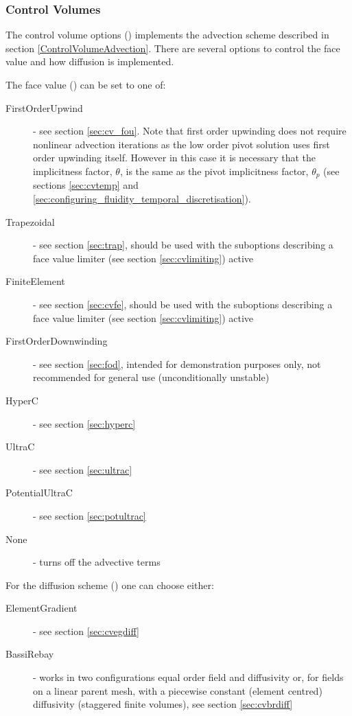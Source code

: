 \subsubsection{Control Volumes}\label{sec:CVs}

The control volume options () implements the advection scheme described in section \ref{ControlVolumeAdvection}. There are 
several options to control the face value and how diffusion is implemented.

The face value () can be set to one of:
\begin{description}
\item[FirstOrderUpwind] - see section \ref{sec:cv_fou}.  Note that first order upwinding does not require nonlinear advection iterations as the low order pivot solution uses first order upwinding itself.  However in this case it is necessary that the implicitness factor, $\theta$, is the same as the pivot implicitness factor, $\theta_p$ (see sections \ref{sec:cvtemp} and \ref{sec:configuring_fluidity_temporal_discretisation}).
\item[Trapezoidal] - see section \ref{sec:trap}, should be used with the suboptions describing a face value limiter (see section \ref{sec:cvlimiting}) active
\item[FiniteElement] - see section \ref{sec:cvfe}, should be used with the suboptions describing a face value limiter (see section \ref{sec:cvlimiting}) active
\item[FirstOrderDownwinding] - see section \ref{sec:fod}, intended for demonstration purposes only, not recommended for general use (unconditionally unstable)
\item[HyperC] - see section \ref{sec:hyperc}
\item[UltraC] - see section \ref{sec:ultrac}
\item[PotentialUltraC] - see section \ref{sec:potultrac}
\item[None] - turns off the advective terms
\end{description}

For the diffusion scheme () one can choose either:
\begin{description}
\item[ElementGradient] - see section \ref{sec:cvegdiff}
\item[BassiRebay] - works in two configurations equal order field and diffusivity or, for fields on a linear parent mesh, with a piecewise constant (element centred) diffusivity (staggered finite volumes), see section \ref{sec:cvbrdiff}
\end{description}

